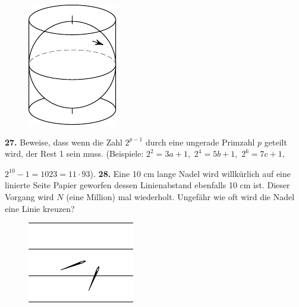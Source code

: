 \documentclass[12pt]{article} %
\begin{document}
\begin{figure}[h]
\centering
\footnotesize
\includegraphics[scale=1]{taskbook-10}
\end{figure}

\newpage
\noindent
{\bf 27.} Beweise, dass wenn die Zahl $2^{p-1}$ durch eine ungerade Primzahl $p$ geteilt wird, der Rest 1 sein muss. (Beispiele: $2^2 = 3a +1,$ $2^4 = 5b+1,$ $2^6 = 7c+1,$ 

$2^{10} - 1 = 1023 = 11\cdot 93$). 
\newline\newline\quad
{\bf 28.} Eine 10 cm lange Nadel wird willkürlich auf eine linierte Seite Papier geworfen dessen Linienabstand ebenfalls 10 cm ist. Dieser Vorgang wird $N$ (eine Million) mal wiederholt. 
Ungefähr wie oft wird die Nadel eine Linie kreuzen? 
\begin{figure}[h]
\centering
\footnotesize
\includegraphics[scale=1]{taskbook-12}
\end{figure}
\end{document}
